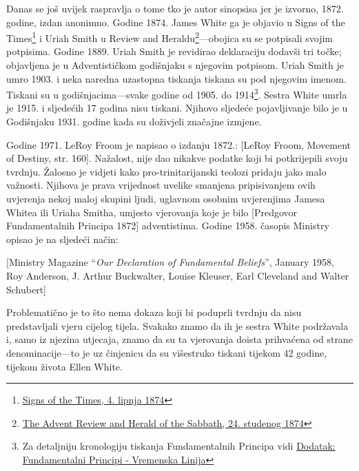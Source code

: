 Danas se još uvijek raspravlja o tome tko je autor sinopsisa jer je izvorno, 1872. godine, izdan anonimno. Godine 1874. James White ga je objavio u Signs of the Times\footnote{\href{https://adventistdigitallibrary.org/adl-364148/signs-times-june-4-1874}{Signs of the Times, 4. lipnja 1874}} i Uriah Smith u Review and Heraldu\footnote{\href{http://documents.adventistarchives.org/Periodicals/RH/RH18741124-V44-22.pdf}{The Advent Review and Herald of the Sabbath, 24. studenog 1874}}—obojica su se potpisali svojim potpisima. Godine 1889. Uriah Smith je revidirao deklaraciju dodavši tri točke; objavljena je u Adventističkom godišnjaku s njegovim potpisom. Uriah Smith je umro 1903. i neka naredna uzastopna tiskanja  tiskana su pod njegovim imenom. Tiskani su u godišnjacima—svake godine od 1905. do 1914\footnote{Za detaljniju kronologiju tiskanja Fundamentalnih Principa vidi \hyperref[appendix:timeline]{Dodatak: Fundamentalni Principi - Vremenska Linija}}. Sestra White umrla je 1915. i sljedećih 17 godina  nisu tiskani. Njihovo sljedeće pojavljivanje bilo je u Godišnjaku 1931. godine kada su doživjeli značajne izmjene.

Godine 1971. LeRoy Froom je napisao o izdanju 1872.: [LeRoy Froom, Movement of Destiny, str. 160]. Nažalost, nije dao nikakve podatke koji bi potkrijepili svoju tvrdnju. Žalosno je vidjeti kako pro-trinitarijanski teolozi pridaju  jako malo važnosti. Njihova je prava vrijednost uvelike smanjena pripisivanjem ovih uvjerenja nekoj maloj skupini ljudi, uglavnom osobnim uvjerenjima Jamesa Whitea ili Uriaha Smitha, umjesto vjerovanja koje je bilo [Predgovor Fundamentalnih Principa 1872] adventistima. Godine 1958. časopis Ministry opisao je  na sljedeći način:

[Ministry Magazine “\textit{Our Declaration of Fundamental Beliefs}”, January 1958, Roy Anderson, J. Arthur Buckwalter, Louise Kleuser, Earl Cleveland and Walter Schubert]

Problematično je to što nema dokaza koji bi poduprli tvrdnju da  nisu predstavljali vjeru cijelog tijela. Svakako znamo da ih je sestra White podržavala i, samo iz njezina utjecaja, znamo da su ta vjerovanja doista prihvaćena od strane denominacije—to je uz činjenicu da su višestruko tiskani tijekom 42 godine, tijekom života Ellen White.

